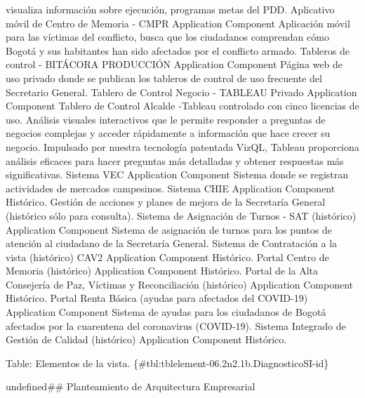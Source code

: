 \documentclass[
	a4paper, %
	12pt, %
]{include/CSSullivanBusinessReport}
\begin{document}
visualiza información sobre ejecución, programas metas del PDD.
\textbar{} \textbar{} Aplicativo móvil de Centro de Memoria - CMPR
\textbar{} Application Component \textbar{} Aplicación móvil para las
víctimas del conflicto, busca que los ciudadanos comprendan cómo Bogotá
y sus habitantes han sido afectados por el conflicto armado. \textbar{}
\textbar{} Tableros de control - BITÁCORA PRODUCCIÓN \textbar{}
Application Component \textbar{} Página web de uso privado donde se
publican los tableros de control de uso frecuente del Secretario
General. \textbar{} \textbar{} Tablero de Control Negocio - TABLEAU
Privado \textbar{} Application Component \textbar{} Tablero de Control
Alcalde -Tableau controlado con cinco licencias de uso. Análisis
visuales interactivos que le permite responder a preguntas de negocios
complejas y acceder rápidamente a información que hace crecer su
negocio. Impulsado por nuestra tecnología patentada VizQL, Tableau
proporciona análisis eficaces para hacer preguntas más detalladas y
obtener respuestas más significativas. \textbar{} \textbar{} Sistema VEC
\textbar{} Application Component \textbar{} Sistema donde se registran
actividades de mercados campesinos. \textbar{} \textbar{} Sistema CHIE
\textbar{} Application Component \textbar{} Histórico. Gestión de
acciones y planes de mejora de la Secretaría General (histórico sólo
para consulta). \textbar{} \textbar{} Sistema de Asignación de Turnos -
SAT (histórico) \textbar{} Application Component \textbar{} Sistema de
asignación de turnos para los puntos de atención al ciudadano de la
Secretaría General. \textbar{} \textbar{} Sistema de Contratación a la
vista (histórico) CAV2 \textbar{} Application Component \textbar{}
Histórico. \textbar{} \textbar{} Portal Centro de Memoria (histórico)
\textbar{} Application Component \textbar{} Histórico. \textbar{}
\textbar{} Portal de la Alta Consejería de Paz, Víctimas y
Reconciliación (histórico) \textbar{} Application Component \textbar{}
Histórico. \textbar{} \textbar{} Portal Renta Básica (ayudas para
afectados del COVID-19) \textbar{} Application Component \textbar{}
Sistema de ayudas para los ciudadanos de Bogotá afectados por la
cuarentena del coronavirus (COVID-19). \textbar{} \textbar{} Sistema
Integrado de Gestión de Calidad (histórico) \textbar{} Application
Component \textbar{} Histórico. \textbar{}

Table: Elementos de la vista.
\{\#tbl:tblelement-06.2n2.1b.DiagnosticoSI-id\}

undefined\#\# Planteamiento de Arquitectura Empresarial
\end{document}
